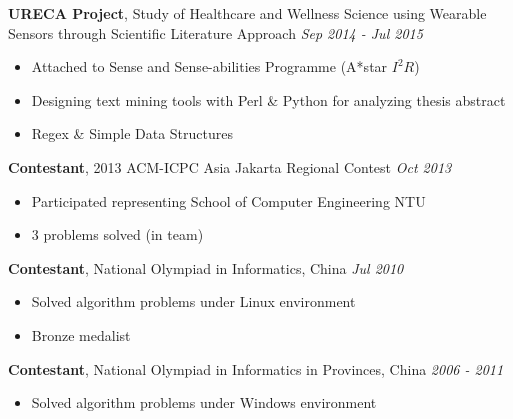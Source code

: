 \documentclass[a4paper, 10pt]{article}
\newenvironment{changemargin}[2]{%
  \begin{list}{}{%
      \setlength{\topsep}{0pt}%
      \setlength{\leftmargin}{#1}%
      \setlength{\rightmargin}{#2}%
      \setlength{\listparindent}{\parindent}%
      \setlength{\itemindent}{\parindent}%
      \setlength{\parsep}{\parskip}%
    }%
  \item[]}{\end{list}
}
\newenvironment{body}
{
\vspace*{-16pt}
\begin{changemargin}{-0.25in}{-0.5in}
}	
{
\end{changemargin}
}
\begin{document}
\begin{body}
  \vspace{14pt}

  \textbf{URECA Project}, {Study of Healthcare and Wellness Science using Wearable Sensors through Scientific Literature Approach} \hfill \emph{Sep 2014 - Jul 2015}\\
  \vspace*{-4pt}
  \begin{itemize} \itemsep -0pt  \small
  \item Attached to Sense and Sense-abilities Programme (A*star $I^{2}R$)
  \item Designing text mining tools with Perl \& Python for analyzing thesis abstract
  \item Regex \& Simple Data Structures
  \end{itemize}

  \textbf{Contestant}, {2013 ACM-ICPC Asia Jakarta Regional Contest} \hfill \emph{Oct 2013}\\
  \vspace*{-4pt}
  \begin{itemize} \itemsep -0pt  \small
  \item Participated representing School of Computer Engineering NTU
  \item 3 problems solved (in team)
  \end{itemize}
  
  \textbf {Contestant}, {National Olympiad in Informatics, China} \hfill \emph{Jul 2010}\\
  \vspace*{-4pt}
  \begin{itemize} \itemsep -0pt \small
  \item Solved algorithm problems under Linux environment
  \item Bronze medalist
  \end{itemize}

  \textbf {Contestant}, {National Olympiad in Informatics in Provinces, China} \hfill \emph{2006 - 2011}\\
  \vspace*{-4pt}
  \begin{itemize} \itemsep -0pt \small
  \item Solved algorithm problems under Windows environment
  \end{itemize}
\end{body}
\end{document}
